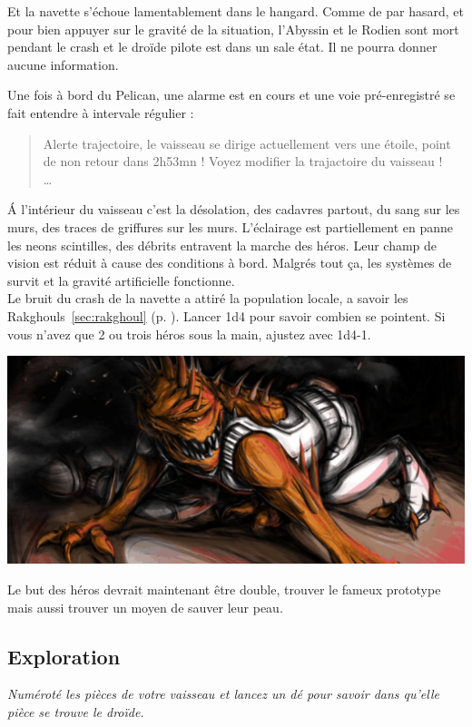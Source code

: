 Et la navette s’échoue lamentablement dans le hangard. Comme de par hasard, et pour bien appuyer sur le gravité de la situation, l’Abyssin et le Rodien sont mort pendant le crash et le droïde pilote est dans un sale état. Il ne pourra donner aucune information.

Une fois à bord du Pelican, une alarme est en cours et une voie pré-enregistré se fait entendre à intervale régulier :

\begin{quote}
	Alerte trajectoire, le vaisseau se dirige actuellement vers une étoile, point de non retour dans 2h53mn ! 
	Voyez modifier la trajactoire du vaisseau !\\ 
	\ldots
\end{quote}

\'A l’intérieur du vaisseau c’est la désolation, des cadavres partout, du sang sur les murs, des traces de griffures sur les murs. L’éclairage est partiellement en panne les neons scintilles, des débrits entravent la marche des héros. Leur champ de vision est réduit à cause des conditions à bord. Malgrés tout ça, les systèmes de survit et la gravité artificielle fonctionne.\\

Le bruit du crash de la navette a attiré la population locale, a savoir les Rakghouls~\ref{sec:rakghoul} (p. \pageref{sec:rakghoul}). Lancer 1d4 pour savoir combien se pointent. Si vous n’avez que 2 ou trois héros sous la main, ajustez avec 1d4-1.

\noindent\includegraphics[width=\linewidth]{_img/dos-au-muur/rakghoul.png}

Le but des héros devrait maintenant être double, trouver le fameux prototype mais aussi trouver un moyen de sauver leur peau. 

\subsection{Exploration}
\emph{Numéroté les pièces de votre vaisseau et lancez un dé pour savoir dans qu’elle pièce se trouve le droïde.}\\

